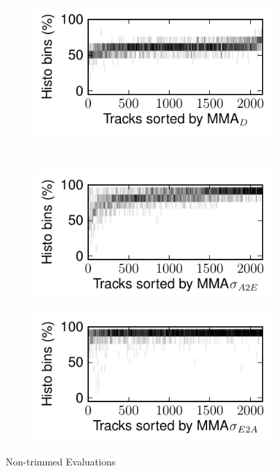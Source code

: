 \documentclass{article}
\begin{document}
\begin{figure}
      \begin{subfigure}[b]{0.25\textwidth}
              \includegraphics[width=\textwidth]{plots/histo-D.pdf}
              \caption{}
              \label{fig:histo-D}
      \end{subfigure}%
      ~ 
      \begin{subfigure}[b]{0.25\textwidth}
              \includegraphics[width=\textwidth]{plots/histo-DevA2E.pdf}
              \caption{}
              \label{fig:histo-DevA2E}
      \end{subfigure}%
       
      \begin{subfigure}[b]{0.25\textwidth}
              \includegraphics[width=\textwidth]{plots/histo-DevE2A.pdf}
              \caption{}
              \label{fig:histo-DevE2A}
      \end{subfigure}%

      \caption{Non-trimmed Evaluations}\label{fig:machine-eval}
\end{figure}
\end{document}

